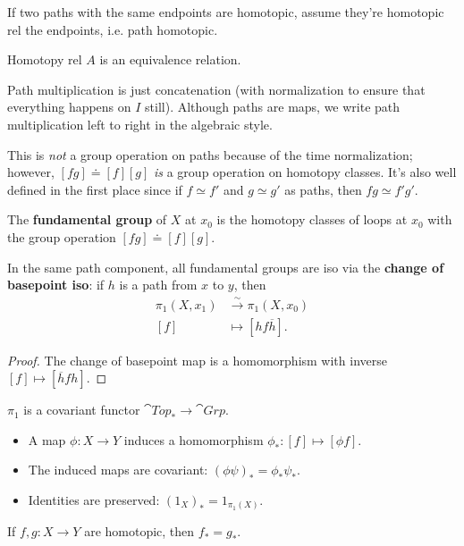 \documentclass[twoside,10pt]{report}
\begin{document}
\begin{note}[]
If two paths with the same endpoints are homotopic, assume they're homotopic rel the endpoints, i.e. path homotopic.
\end{note}

\begin{prop}
	Homotopy rel $A$ is an equivalence relation.
\end{prop}

Path multiplication is just concatenation (with normalization to ensure that everything happens on $I$ still). Although paths are maps, we write path multiplication left to right in the algebraic style.

This is \textit{not} a group operation on paths because of the time normalization; however, $[fg] \doteq [f][g]$ \textit{is} a group operation on homotopy classes. It's also well defined in the first place since if $f \simeq f'$ and $g \simeq g'$ as paths, then $fg \simeq f'g'$.

\begin{defn}[]
	The \textbf{fundamental group} of $X$ at $x_0$ is the homotopy classes of loops at $x_0$ with the group operation $[fg]\doteq [f][g]$.
\end{defn}

\begin{prop}
	In the same path component, all fundamental groups are iso via the \textbf{change of basepoint iso}: if $h$ is a path from $x$ to $y$, then
	\begin{align*}
		\pi_1(X,x_1) &\stackrel{\sim}{\to } \pi_1(X,x_0) \\
		[f] &\mapsto [h f \overline{h}].
	\end{align*}
\end{prop}
\begin{proof}
	The change of basepoint map is a homomorphism with inverse $[f] \mapsto [\overline{h}fh]$.
\end{proof}

$\pi_1$ is a covariant functor $\cat{Top}_{*}\to \cat{Grp}$.
\begin{itemize}
	\item A map $\phi:X\to Y$ induces a homomorphism $\phi_{*} : [f] \mapsto [\phi f]$.
	\item The induced maps are covariant: $(\phi\psi)_{*} = \phi_{*}\psi_{*}$.
	\item Identities are preserved: $(1_{X})_{*} = 1_{\pi_1(X)}$.
\end{itemize}

\begin{prop}
If $f,g:X\to Y$ are homotopic, then $f_{*} = g_{*}$.
\end{prop}
\end{document}
